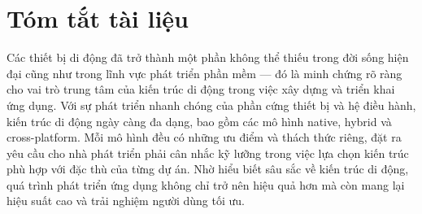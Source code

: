 \chapter*{Tóm tắt tài liệu}

\hspace*{0.8cm}Các thiết bị di động đã trở thành một phần không thể thiếu trong đời sống hiện đại cũng như trong lĩnh vực phát triển phần mềm — đó là minh chứng rõ ràng cho vai trò trung tâm của kiến trúc di động trong việc xây dựng và triển khai ứng dụng. Với sự phát triển nhanh chóng của phần cứng thiết bị và hệ điều hành, kiến trúc di động ngày càng đa dạng, bao gồm các mô hình native, hybrid và cross-platform. Mỗi mô hình đều có những ưu điểm và thách thức riêng, đặt ra yêu cầu cho nhà phát triển phải cân nhắc kỹ lưỡng trong việc lựa chọn kiến trúc phù hợp với đặc thù của từng dự án. Nhờ hiểu biết sâu sắc về kiến trúc di động, quá trình phát triển ứng dụng không chỉ trở nên hiệu quả hơn mà còn mang lại hiệu suất cao và trải nghiệm người dùng tối ưu.

